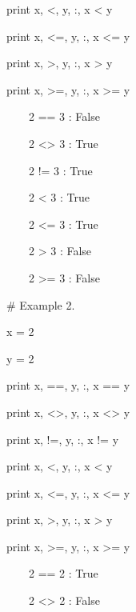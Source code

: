 \documentclass[12pt,twoside]{book}
\begin{document}
print x, {\textquotedbl}{\textless}{\textquotedbl}, y,
{\textquotedbl}:{\textquotedbl}, x {\textless} y

print x, {\textquotedbl}{\textless}={\textquotedbl}, y,
{\textquotedbl}:{\textquotedbl}, x {\textless}= y

print x, {\textquotedbl}{\textgreater}{\textquotedbl}, y,
{\textquotedbl}:{\textquotedbl}, x {\textgreater} y

print x, {\textquotedbl}{\textgreater}={\textquotedbl}, y,
{\textquotedbl}:{\textquotedbl}, x {\textgreater}= y

{\textbar}

\ \ \ \ 2 == 3 : False

\ \ \ \ 2 {\textless}{\textgreater} 3 : True

\ \ \ \ 2 != 3 : True

\ \ \ \ 2 {\textless} 3 : True

\ \ \ \ 2 {\textless}= 3 : True

\ \ \ \ 2 {\textgreater} 3 : False

\ \ \ \ 2 {\textgreater}= 3 : False


\bigskip

\# Example 2.

x = 2

y = 2 \ 


\bigskip

print x, {\textquotedbl}=={\textquotedbl}, y,
{\textquotedbl}:{\textquotedbl}, x == y

print x, {\textquotedbl}{\textless}{\textgreater}{\textquotedbl}, y,
{\textquotedbl}:{\textquotedbl}, x {\textless}{\textgreater} y

print x, {\textquotedbl}!={\textquotedbl}, y,
{\textquotedbl}:{\textquotedbl}, x != y

print x, {\textquotedbl}{\textless}{\textquotedbl}, y,
{\textquotedbl}:{\textquotedbl}, x {\textless} y

print x, {\textquotedbl}{\textless}={\textquotedbl}, y,
{\textquotedbl}:{\textquotedbl}, x {\textless}= y

print x, {\textquotedbl}{\textgreater}{\textquotedbl}, y,
{\textquotedbl}:{\textquotedbl}, x {\textgreater} y

print x, {\textquotedbl}{\textgreater}={\textquotedbl}, y,
{\textquotedbl}:{\textquotedbl}, x {\textgreater}= y

{\textbar}

\ \ \ \ 2 == 2 : True

\ \ \ \ 2 {\textless}{\textgreater} 2 : False
\end{document}
